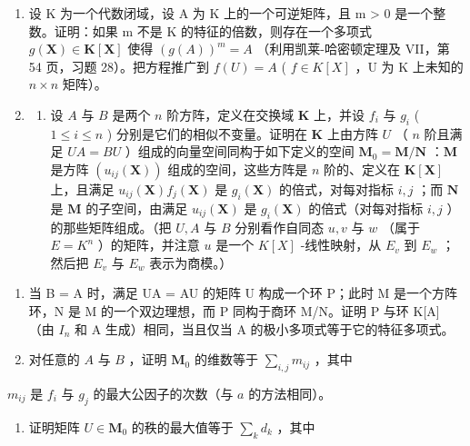 \begin{enumerate}
\def\labelenumi{\arabic{enumi})}
\setcounter{enumi}{10}
\item
  设 K 为一个代数闭域，设 A 为 K 上的一个可逆矩阵，且 m \textgreater{} 0 是一个整数。证明：如果 m 不是 K 的特征的倍数，则存在一个多项式 \(g(\mathbf{X}) \in \mathbf{K}[\mathbf{X}]\) 使得 \((g(A))^{m} = A\) （利用凯莱-哈密顿定理及 VII，第 54 页，习题 28）。把方程推广到 \(f(U) = A\) ( \(f \in K[X]\) ，U 为 K 上未知的 \(n \times n\) 矩阵）。
\item
  \begin{enumerate}
  \def\labelenumii{\alph{enumii})}
  \tightlist
  \item
    设 \(A\) 与 \(B\) 是两个 \(n\) 阶方阵，定义在交换域 \(\mathbf{K}\) 上，并设 \(f_i\) 与 \(g_i\) ( \(1 \leqslant i \leqslant n\) ) 分别是它们的相似不变量。证明在 \(\mathbf{K}\) 上由方阵 \(U\) （ \(n\) 阶且满足 \(UA = BU\) ）组成的向量空间同构于如下定义的空间 \(\mathbf{M}_0 = \mathbf{M} / \mathbf{N}\) ：\(\mathbf{M}\) 是方阵 \((u_{ij}(\mathbf{X}))\) 组成的空间，这些方阵是 \(n\) 阶的、定义在 \(\mathbf{K}[\mathbf{X}]\) 上，且满足 \(u_{ij}(\mathbf{X}) f_j(\mathbf{X})\) 是 \(g_i(\mathbf{X})\) 的倍式，对每对指标 \(i, j\) ；而 \(\mathbf{N}\) 是 \(\mathbf{M}\) 的子空间，由满足 \(u_{ij}(\mathbf{X})\) 是 \(g_i(\mathbf{X})\) 的倍式（对每对指标 \(i, j\) ）的那些矩阵组成。（把 \(U, A\) 与 \(B\) 分别看作自同态 \(u, v\) 与 \(w\) （属于 \(E = K^n\) ）的矩阵，并注意 \(u\) 是一个 \(K[X]\) -线性映射，从 \(E_v\) 到 \(E_w\) ；然后把 \(E_v\) 与 \(E_w\) 表示为商模。）
  \end{enumerate}
\end{enumerate}

\begin{enumerate}
\def\labelenumi{\alph{enumi})}
\setcounter{enumi}{1}
\item
  当 B = A 时，满足 UA = AU 的矩阵 U 构成一个环 P；此时 M 是一个方阵环，N 是 M 的一个双边理想，而 P 同构于商环 M/N。证明 P 与环 K{[}A{]} （由 \(I_{n}\) 和 A 生成）相同，当且仅当 A 的极小多项式等于它的特征多项式。
\item
  对任意的 \(A\) 与 \(B\) ，证明 \(\mathbf{M}_0\) 的维数等于 \(\sum_{i,j} m_{ij}\) ，其中
\end{enumerate}

\(m_{ij}\) 是 \(f_i\) 与 \(g_j\) 的最大公因子的次数（与 \(a\) 的方法相同）。

\begin{enumerate}
\def\labelenumi{\alph{enumi})}
\setcounter{enumi}{3}
\tightlist
\item
  证明矩阵 \(U \in \mathbf{M}_0\) 的秩的最大值等于 \(\sum_{k} d_k\) ，其中
\end{enumerate}

